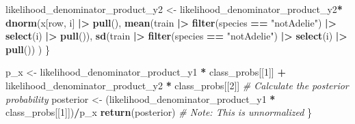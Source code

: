 \documentclass[
]{article}
\newenvironment{Shaded}{\begin{snugshade}}{\end{snugshade}}
\newcommand{\CommentTok}[1]{\textcolor[rgb]{0.56,0.35,0.01}{\textit{#1}}}
\newcommand{\DecValTok}[1]{\textcolor[rgb]{0.00,0.00,0.81}{#1}}
\newcommand{\FunctionTok}[1]{\textcolor[rgb]{0.13,0.29,0.53}{\textbf{#1}}}
\newcommand{\NormalTok}[1]{#1}
\newcommand{\OtherTok}[1]{\textcolor[rgb]{0.56,0.35,0.01}{#1}}
\newcommand{\SpecialCharTok}[1]{\textcolor[rgb]{0.81,0.36,0.00}{\textbf{#1}}}
\newcommand{\StringTok}[1]{\textcolor[rgb]{0.31,0.60,0.02}{#1}}
\begin{document}
\begin{Shaded}
\begin{Highlighting}[]
\NormalTok{    likelihood\_denominator\_product\_y2 }\OtherTok{\textless{}{-}}\NormalTok{ likelihood\_denominator\_product\_y2}\SpecialCharTok{*}
      \FunctionTok{dnorm}\NormalTok{(x[row, i] }\SpecialCharTok{|\textgreater{}} \FunctionTok{pull}\NormalTok{(),}
            \FunctionTok{mean}\NormalTok{(train }\SpecialCharTok{|\textgreater{}} \FunctionTok{filter}\NormalTok{(species }\SpecialCharTok{==} \StringTok{"notAdelie"}\NormalTok{) }\SpecialCharTok{|\textgreater{}} \FunctionTok{select}\NormalTok{(i) }\SpecialCharTok{|\textgreater{}} \FunctionTok{pull}\NormalTok{()), }
            \FunctionTok{sd}\NormalTok{(train }\SpecialCharTok{|\textgreater{}} \FunctionTok{filter}\NormalTok{(species }\SpecialCharTok{==} \StringTok{"notAdelie"}\NormalTok{) }\SpecialCharTok{|\textgreater{}} \FunctionTok{select}\NormalTok{(i) }\SpecialCharTok{|\textgreater{}} \FunctionTok{pull}\NormalTok{())}
\NormalTok{    )}
\NormalTok{  \}}
  

\NormalTok{  p\_x }\OtherTok{\textless{}{-}}\NormalTok{ likelihood\_denominator\_product\_y1 }\SpecialCharTok{*}\NormalTok{ class\_probs[[}\DecValTok{1}\NormalTok{]] }\SpecialCharTok{+}\NormalTok{ likelihood\_denominator\_product\_y2 }\SpecialCharTok{*}\NormalTok{ class\_probs[[}\DecValTok{2}\NormalTok{]]}
  \CommentTok{\# Calculate the  posterior probability}
\NormalTok{  posterior }\OtherTok{\textless{}{-}}\NormalTok{ (likelihood\_denominator\_product\_y1 }\SpecialCharTok{*}\NormalTok{ class\_probs[[}\DecValTok{1}\NormalTok{]])}\SpecialCharTok{/}\NormalTok{p\_x}
  \FunctionTok{return}\NormalTok{(posterior)  }\CommentTok{\# Note: This is unnormalized}
\NormalTok{\}}


\end{Highlighting}
\end{Shaded}
\end{document}
